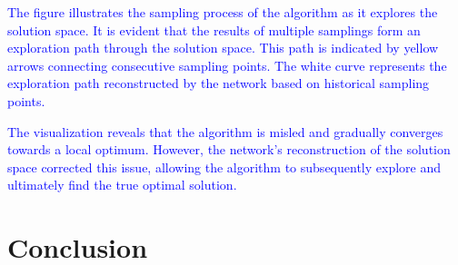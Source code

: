 \documentclass[journal,twoside]{IEEEtran}
\begin{document}
\textcolor{blue}{
The figure illustrates the sampling process of the algorithm as it explores the solution space. It is evident that the results of multiple samplings form an exploration path through the solution space. This path is indicated by yellow arrows connecting consecutive sampling points. The white curve represents the exploration path reconstructed by the network based on historical sampling points.}

\textcolor{blue}{
The visualization reveals that the algorithm is misled and gradually converges towards a local optimum. However, the network's reconstruction of the solution space corrected this issue, allowing the algorithm to subsequently explore and ultimately find the true optimal solution.}

\section{Conclusion}\label{sec_conclusion}

\end{document}
